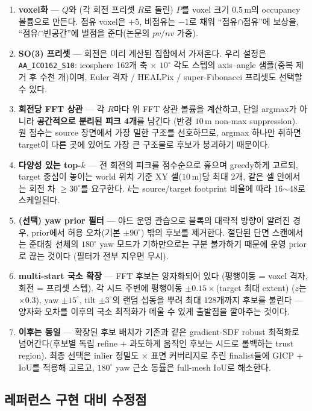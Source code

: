 \begin{enumerate}
  \item \textbf{voxel화} --- $Q$와 (각 회전 프리셋 $R$로 돌린) $P$를
  voxel 크기 $0.5\,$m의 occupancy 볼륨으로 만든다. 점유 voxel은 $+5$,
  비점유는 $-1$로 채워 ``점유$\cap$점유''에 보상을, ``점유$\cap$빈공간''에
  벌점을 준다(논문의 $pv/nv$ 가중).
  \item \textbf{SO(3) 프리셋} --- 회전은 미리 계산된 집합에서 가져온다.
  우리 설정은 \texttt{AA\_ICO162\_S10}: icosphere 162개 축 $\times$
  $10^\circ$ 각도 스텝의 axis--angle 샘플(중복 제거 후 수천 개)이며,
  Euler 격자 / HEALPix / super-Fibonacci 프리셋도 선택할 수 있다.
  \item \textbf{회전당 FFT 상관} --- 각 $R$마다 위 FFT 상관 볼륨을 계산하고,
  단일 argmax가 아니라 \textbf{공간적으로 분리된 피크 4개}를 남긴다
  (반경 $10\,$m non-max suppression). 원 점수는 source 장면에서 가장 밀한
  구조를 선호하므로, argmax 하나만 취하면 target이 다른 곳에 있어도 가장
  큰 구조물로 후보가 붕괴하기 때문이다.
  \item \textbf{다양성 있는 top-$k$} --- 전 회전의 피크를 점수순으로 훑으며
  greedy하게 고르되, target 중심이 놓이는 world 위치 기준 XY 셀($10\,$m)당
  최대 2개, 같은 셀 안에서는 회전 차 $\ge 30^\circ$를 요구한다. $k$는
  source/target footprint 비율에 따라 16$\sim$48로 스케일된다.
  \item \textbf{(선택) yaw prior 필터} --- 야드 운영 관습으로 블록의
  대략적 방향이 알려진 경우, prior에서 허용 오차(기본 $\pm90^\circ$) 밖의
  후보를 제거한다. 절단된 단면 스캔에서는 준대칭 선체의 $180^\circ$ yaw
  모드가 기하만으로는 구분 불가하기 때문에 운영 prior로 끊는 것이다
  (필터가 전부 지우면 무시).
  \item \textbf{multi-start 국소 확장} --- FFT 후보는 양자화되어 있다
  (평행이동 = voxel 격자, 회전 = 프리셋 스텝). 각 시드 주변에 평행이동
  $\pm0.15\times$(target 최대 extent) ($z$는 $\times0.3$), yaw
  $\pm15^\circ$, tilt $\pm3^\circ$의 랜덤 섭동을 뿌려 최대 128개까지
  후보를 불린다 --- 양자화 오차를 이후의 국소 최적화가 메울 수 있게
  출발점을 깔아주는 것이다.
  \item \textbf{이후는 동일} --- 확장된 후보 배치가 기존과 같은
  gradient-SDF robust 최적화로 넘어간다(후보별 독립 refine + 과도하게
  움직인 후보는 시드로 롤백하는 trust region). 최종 선택은 inlier
  정밀도 $\times$ 표면 커버리지로 추린 finalist들에 GICP + IoU를 적용해
  고르고, $180^\circ$ yaw 근소 동률은 full-mesh IoU로 해소한다.
\end{enumerate}

\subsection{레퍼런스 구현 대비 수정점}
\label{sec:fft-init-mods}

